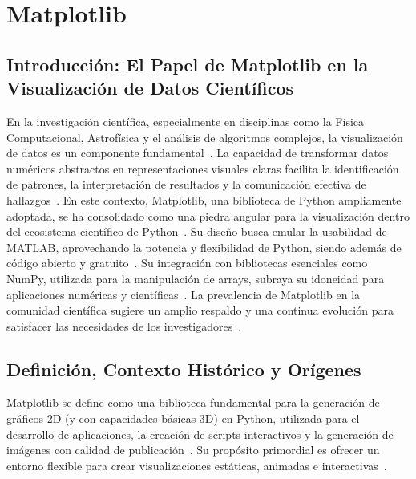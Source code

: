 \section{Matplotlib}

\subsection{Introducción: El Papel de Matplotlib en la Visualización de Datos Científicos}%
\label{subsec:introduccion}

En la investigación científica, especialmente en disciplinas como la Física Computacional, Astrofísica y el análisis de algoritmos complejos, la visualización de datos es un componente fundamental~\cite{VanderPlas2016}. La capacidad de transformar datos numéricos abstractos en representaciones visuales claras facilita la identificación de patrones, la interpretación de resultados y la comunicación efectiva de hallazgos~\cite{Hunter2007}. En este contexto, Matplotlib, una biblioteca de Python ampliamente adoptada, se ha consolidado como una piedra angular para la visualización dentro del ecosistema científico de Python~\cite{MatplotlibDevTeamMain}. Su diseño busca emular la usabilidad de MATLAB, aprovechando la potencia y flexibilidad de Python, siendo además de código abierto y gratuito~\cite{ActiveStateMatplotlib}. Su integración con bibliotecas esenciales como NumPy, utilizada para la manipulación de arrays, subraya su idoneidad para aplicaciones numéricas y científicas~\cite{VanderPlas2016, GeeksforGeeksSciComp}. La prevalencia de Matplotlib en la comunidad científica sugiere un amplio respaldo y una continua evolución para satisfacer las necesidades de los investigadores~\cite{MatplotlibDevTeamMain}.

\subsection{Definición, Contexto Histórico y Orígenes}%
\label{subsec:definicion_historia}

Matplotlib se define como una biblioteca fundamental para la generación de gráficos 2D (y con capacidades básicas 3D) en Python, utilizada para el desarrollo de aplicaciones, la creación de scripts interactivos y la generación de imágenes con calidad de publicación~\cite{Hunter2007, ActiveStateMatplotlib}. Su propósito primordial es ofrecer un entorno flexible para crear visualizaciones estáticas, animadas e interactivas~\cite{ActiveStateMatplotlib}.

